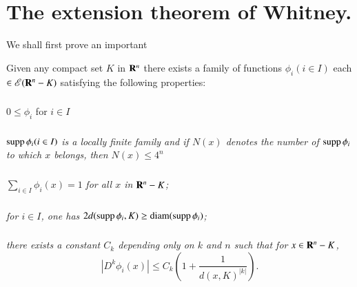 \section[The extension theorem of Whitney]{The extension theorem of Whitney.}\label{chap1-sec3}

We shall first prove an important

\begin{lemma}\label{chap1-lem3.1}
Given any compact set $K$ in $\mathbf{R}^{n}$ there exists a family of functions $\phi_{i}(i\in I)$ each $\in \mathscr{E}(\mathbf{R}^{n}-K)$ satisfying the following properties:
\end{lemma}

\setcounter{subsection}{1}
\subsubsection{}\label{chap1-sec3.1.1}\pageoriginale
$0\leq \phi_{i}$ for $i\in I$

\subsubsection{}\label{chap1-sec3.1.2}
$\operatorname{supp} \phi_{i}(i\in I)$ {\em is a locally finite family and if $N(x)$ denotes the number of $\operatorname{supp} \phi_{i}$ to which $x$ belongs, then $N(x)\leq 4^{n}$}

\subsubsection{}\label{chap1-sec3.1.3}
$\sum\limits_{i\in I}\phi_{i}(x)=1$ {\em for all $x$ in $\mathbf{R}^{n}-K$;}

\subsubsection{}\label{chap1-sec3.1.4}
{\em for $i\in I$, one has $2d(\operatorname{supp} \phi_{i},K)\geq \operatorname{diam} (\operatorname{supp} \phi_{i})$;}

\subsubsection{}\label{chap1-sec3.1.5}
{\em there exists a constant $C_{k}$ depending only on $k$ and $n$ such that for $x\in \mathbf{R}^{n}-K$,}
$$
|D^{k}\phi_{i}(x)|\leq C_{k}\left(1+\dfrac{1}{d(x,K)^{|k|}}\right).
$$

